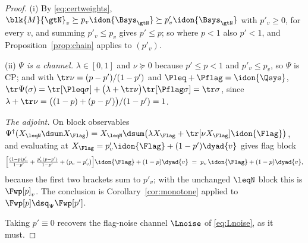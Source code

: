 \begin{proof}
(i) By \eqref{eq:certweights},
$\blk{M}{\gtN}_v\succeq p_v\idon{\Bsys_{\gtN}}\succeq p'_v\idon{\Bsys_{\gtN}}$
with $p'_v\ge0$, for every $v$, and summing $p'_v\le p_v$ gives $p'\le p$; so
where $p<1$ also $p'<1$, and Proposition~\ref{prop:chain} applies to
$(p'_v)$.

(ii) \emph{$\Psi$ is a channel.} $\lambda\in[0,1]$ and $\nu\succeq0$ because
$p'\le p<1$ and $p'_v\le p_v$, so $\Psi$ is CP; and with
$\tr\nu=(p-p')/(1-p')$ and $\Pleq+\Pflag=\idon{\Qsys}$,
$\tr\Psi(\sigma)=\tr[\Pleq\sigma]+\big(\lambda+\tr\nu\big)\tr[\Pflag\sigma]
=\tr\sigma$, since
$\lambda+\tr\nu=\big((1-p)+(p-p')\big)/(1-p')=1$.

\emph{The adjoint.} On block observables
$\Psi^{\dagger}(X_{\leqN}\dsum X_{\Flag})
=X_{\leqN}\dsum\big(\lambda X_{\Flag}+\tr[\nu X_{\Flag}]\idon{\Flag}\big)$, and
evaluating at $X_{\Flag}=p'_v\idon{\Flag}+(1-p')\dyad{v}$ gives flag block
\begin{equation*}
  \Big[\tfrac{(1-p)p'_v}{1-p'}+\tfrac{p'_v(p-p')}{1-p'}+(p_v-p'_v)\Big]\idon{\Flag}
  +(1-p)\dyad{v}
  \;=\;p_v\,\idon{\Flag}+(1-p)\dyad{v},
\end{equation*}
because the first two brackets sum to $p'_v$; with the unchanged $\leqN$ block
this is $\Fwp[p]_v$. The conclusion is Corollary~\ref{cor:monotone} applied
to $\Fwp[p]\dsq_{\Psi}\Fwp[p']$.

Taking $p'\equiv0$ recovers the flag-noise channel $\Lnoise$ of
\eqref{eq:Lnoise}, as it must.
\end{proof}
